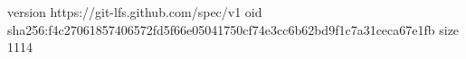 version https://git-lfs.github.com/spec/v1
oid sha256:f4c27061857406572fd5f66e05041750cf74e3cc6b62bd9f1c7a31ceca67e1fb
size 1114
